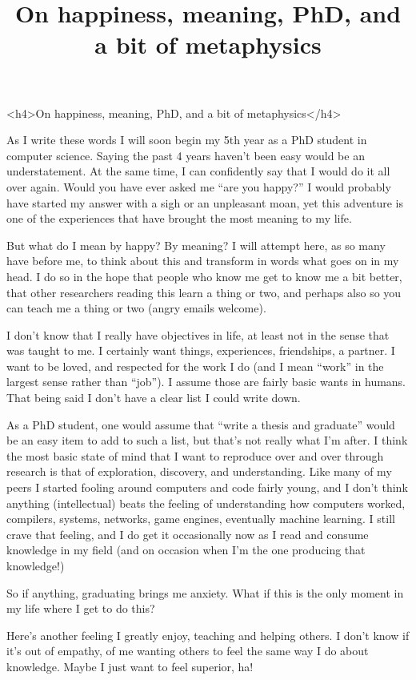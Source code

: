 \title{On happiness, meaning, PhD, and a bit of metaphysics}

<h4>On happiness, meaning, PhD, and a bit of metaphysics</h4>

As I write these words I will soon begin my 5th year as a PhD student in computer science. Saying the past 4 years haven't been easy would be an understatement. At the same time, I can confidently say that I would do it all over again. Would you have ever asked me “are you happy?” I would probably have started my answer with a sigh or an unpleasant moan, yet this adventure is one of the experiences that have brought the most meaning to my life. 

But what do I mean by happy? By meaning? I will attempt here, as so many have before me, to think about this and transform in words what goes on in my head. I do so in the hope that people who know me get to know me a bit better, that other researchers reading this learn a thing or two, and perhaps also so you can teach me a thing or two (angry emails welcome).

I don’t know that I really have objectives in life, at least not in the sense that was taught to me. I certainly want things, experiences, friendships, a partner. I want to be loved, and respected for the work I do (and I mean “work” in the largest sense rather than “job”). I assume those are fairly basic wants in humans. That being said I don’t have a clear list I could write down. 

As a PhD student, one would assume that “write a thesis and graduate” would be an easy item to add to such a list, but that’s not really what I’m after. I think the most basic state of mind that I want to reproduce over and over through research is that of exploration, discovery, and understanding. Like many of my peers I started fooling around computers and code fairly young, and I don’t think anything (intellectual) beats the feeling of understanding how computers worked, compilers, systems, networks, game engines, eventually machine learning. I still crave that feeling, and I do get it occasionally now as I read and consume knowledge in my field (and on occasion when I’m the one producing that knowledge!)

So if anything, graduating brings me anxiety. What if this is the only moment in my life where I get to do this?

Here’s another feeling I greatly enjoy, teaching and helping others. I don’t know if it’s out of empathy, of me wanting others to feel the same way I do about knowledge. Maybe I just want to feel superior, ha!

